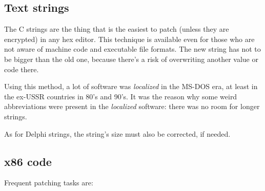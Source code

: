 
\subsection{Text strings}

The C strings are the thing that is the easiest to patch (unless they are encrypted) in any hex editor.
This technique is available even for those who are not aware of machine code and executable file formats.
The new string has not to be bigger than the old one, because there's a risk of overwriting another value or code
there.

Using this method, a lot of software was \emph{localized} in the MS-DOS era, at least in the ex-USSR countries in 80's
and 90's.
It was the reason why some weird abbreviations were present in the \emph{localized} software: there was no room for
longer strings.


As for Delphi strings, the string's size must also be corrected, if needed.

\subsection{x86 code}
\label{x86_patching}

Frequent patching tasks are:

